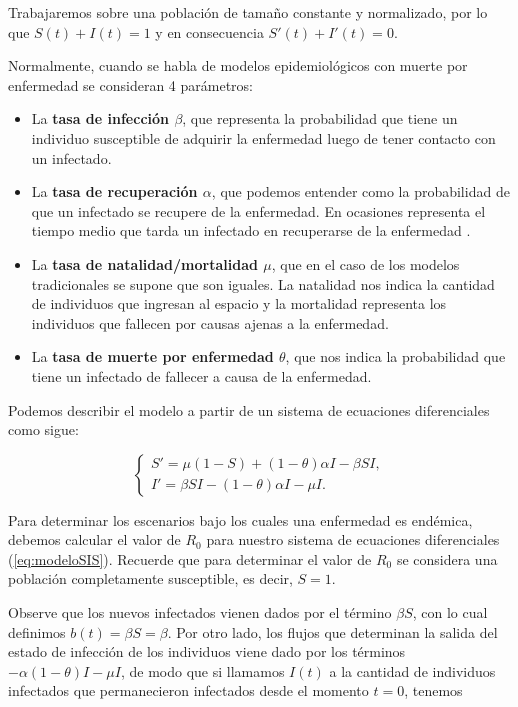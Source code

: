 Trabajaremos sobre una población de tamaño constante y normalizado, por lo que $S(t) + I(t) = 1$ y en consecuencia $S'(t) + I'(t) = 0$.

Normalmente, cuando se habla de modelos epidemiológicos con muerte por enfermedad se consideran 4 parámetros: 

\begin{itemize}
    \item La \textbf{tasa de infección $\beta$}, que representa la probabilidad que tiene un individuo susceptible de adquirir la enfermedad luego de tener contacto con un infectado.
    \item La \textbf{tasa de recuperación $\alpha$}, que podemos entender como la probabilidad de que un infectado se recupere de la enfermedad. En ocasiones representa el tiempo medio que tarda un infectado en recuperarse de la enfermedad \cite{diego2010}.
    \item La \textbf{tasa de natalidad/mortalidad $\mu$}, que en el caso de los modelos tradicionales se supone que son iguales. La natalidad nos indica la cantidad de individuos que ingresan al espacio y la mortalidad representa los individuos que fallecen por causas ajenas a la enfermedad.
    \item La \textbf{tasa de muerte por enfermedad $\theta$}, que nos indica la probabilidad que tiene un infectado de fallecer a causa de la enfermedad.
\end{itemize}

Podemos describir el modelo a partir de un sistema de ecuaciones diferenciales como sigue:

\begin{equation}\label{eq:modeloSIS}
\left\{
\begin{array}{l}
S' = \mu(1 - S) + (1 - \theta)\alpha I - \beta S I, \\
I' = \beta S I - (1 - \theta)\alpha I - \mu I.
\end{array}
\right.
\end{equation}

Para determinar los escenarios bajo los cuales una enfermedad es endémica, debemos calcular el valor de $R_0$ para nuestro sistema de ecuaciones diferenciales (\ref{eq:modeloSIS}). Recuerde que para determinar el valor de $R_0$ se considera una población completamente susceptible, es decir, $S=1$.

Observe que los nuevos infectados vienen dados por el término $\beta S$, con lo cual definimos $b(t) = \beta S = \beta$. Por otro lado, los flujos que determinan la salida del estado de infección de los individuos viene dado por los términos $-\alpha(1-\theta)I-\mu I$, de modo que si llamamos $I(t)$ a la cantidad de individuos infectados que permanecieron infectados desde el momento $t=0$, tenemos

